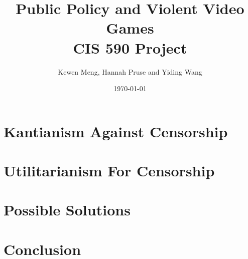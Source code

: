\documentclass[11pt]{article}
\title{%
  Public Policy and Violent Video Games \\
  \large CIS 590 Project\vspace{-2ex}}
\author{Kewen Meng, Hannah Pruse and Yiding Wang}
\date{\today}
\begin{document}
\maketitle
\vspace{-10mm}



\section*{Kantianism Against Censorship}


\section*{Utilitarianism For Censorship}

 
\section*{Possible Solutions}


\section*{Conclusion}



\end{document}
